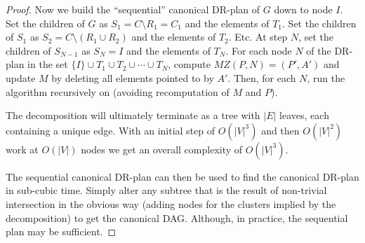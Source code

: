 \begin{proof}

    Now we build the ``sequential'' canonical DR-plan of $G$ down to node $I$.
    Set the children of $G$ as $S_1=C\setminus R_1=C_1$ and the elements of $T_1$. Set the children of $S_1$ as $S_2=C\setminus (R_1\cup R_2)$ and the elements of $T_2$. Etc. At step $N$, set the children of $S_{N-1}$ as $S_N=I$ and the elements of $T_N$.
    For each node $N$ of the DR-plan in the set $\{I\}\cup T_1\cup T_2\cup \cdots\cup T_N$, compute $MZ(P, N)=(P', A')$ and update $M$ by deleting all elements pointed to by $A'$. Then, for each $N$, run the algorithm recursively on (avoiding recomputation of $M$ and $P$).

    The decomposition will ultimately terminate as a tree with $|E|$ leaves, each containing a unique edge. With an initial step of $O(|V|^3)$ and then $O(|V|^2)$ work at $O(|V|)$ nodes we get an overall complexity of $O(|V|^3)$.

    The sequential canonical DR-plan can then be used to find the canonical DR-plan in
    sub-cubic
    time. Simply alter any subtree that is the result of non-trivial intersection in the obvious way (adding nodes for the clusters implied by the decomposition) to get the canonical DAG. Although, in practice, the sequential plan may be sufficient.
\end{proof}











